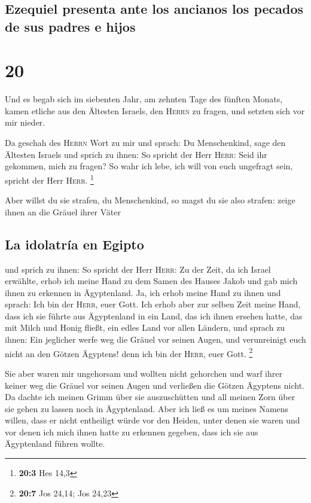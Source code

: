 \hypertarget{ezequiel-presenta-ante-los-ancianos-los-pecados-de-sus-padres-e-hijos}{%
\subsection{Ezequiel presenta ante los ancianos los pecados de sus
padres e
hijos}\label{ezequiel-presenta-ante-los-ancianos-los-pecados-de-sus-padres-e-hijos}}

\hypertarget{section-19}{%
\section{20}\label{section-19}}

 Und es begab sich im siebenten Jahr, am zehnten Tage des
fünften Monats, kamen etliche aus den Ältesten Israels, den
\textsc{Herrn} zu fragen, und setzten sich vor mir nieder.

 Da geschah des \textsc{Herrn} Wort zu mir und sprach:
 Du Menschenkind, sage den Ältesten Israels und sprich zu
ihnen: So spricht der Herr \textsc{Herr}: Seid ihr gekommen, mich zu
fragen? So wahr ich lebe, ich will von euch ungefragt sein, spricht der
Herr \textsc{Herr}. \footnote{\textbf{20:3} Hes 14,3}

 Aber willst du sie strafen, du Menschenkind, so magst du
sie also strafen: zeige ihnen an die Gräuel ihrer Väter

\hypertarget{la-idolatruxeda-en-egipto}{%
\subsection{La idolatría en Egipto}\label{la-idolatruxeda-en-egipto}}

 und sprich zu ihnen: So spricht der Herr \textsc{Herr}:
Zu der Zeit, da ich Israel erwählte, erhob ich meine Hand zu dem Samen
des Hauses Jakob und gab mich ihnen zu erkennen in Ägyptenland. Ja, ich
erhob meine Hand zu ihnen und sprach: Ich bin der \textsc{Herr}, euer
Gott.  Ich erhob aber zur selben Zeit meine Hand, dass ich
sie führte aus Ägyptenland in ein Land, das ich ihnen ersehen hatte, das
mit Milch und Honig fließt, ein edles Land vor allen Ländern,
 und sprach zu ihnen: Ein jeglicher werfe weg die Gräuel
vor seinen Augen, und verunreinigt euch nicht an den Götzen Ägyptens!
denn ich bin der \textsc{Herr}, euer Gott. \footnote{\textbf{20:7} Jos
  24,14; Jos 24,23}

 Sie aber waren mir ungehorsam und wollten nicht gehorchen
und warf ihrer keiner weg die Gräuel vor seinen Augen und verließen die
Götzen Ägyptens nicht. Da dachte ich meinen Grimm über sie auszuschütten
und all meinen Zorn über sie gehen zu lassen noch in Ägyptenland.
 Aber ich ließ es um meines Namens willen, dass er nicht
entheiligt würde vor den Heiden, unter denen sie waren und vor denen ich
mich ihnen hatte zu erkennen gegeben, dass ich sie aus Ägyptenland
führen wollte.

